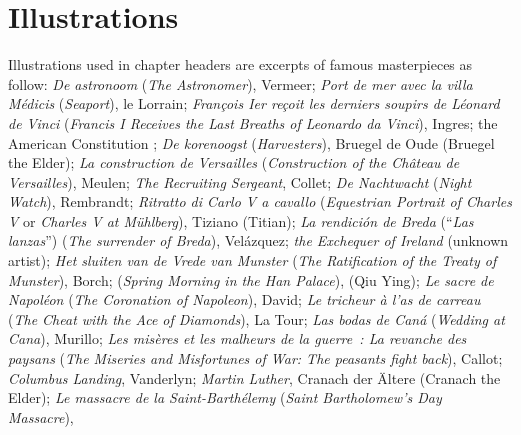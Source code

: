 \section*{Illustrations}
Illustrations used in
chapter headers are excerpts of famous masterpieces as follow:
\emph{De astronoom} (\emph{The Astronomer}), %
Vermeer;
\emph{Port de mer avec la villa Médicis} (\emph{Seaport}),
le Lorrain;
\emph{François I\textup{er} reçoit les derniers soupirs de Léonard de Vinci}
(\emph{Francis I Receives the Last Breaths of Leonardo da Vinci}),
Ingres;
the American Constitution%
;
\emph{De korenoogst} (\emph{Harvesters}), %
Bruegel de Oude (Bruegel the Elder);
\emph{La construction de Versailles} (\emph{Construction of the Château de
  Versailles}), %
Meulen;
\emph{The Recruiting Sergeant}, %
Collet;
\emph{De Nachtwacht} (\emph{Night Watch}), Rembrandt;
\emph{Ritratto di Carlo V a cavallo} (\emph{Equestrian Portrait of Charles V}
or \emph{Charles V at Mühlberg}), Tiziano %
(Titian);
\emph{La rendición de Breda} (``\emph{Las lanzas}'') (\emph{The surrender of
  Breda}), %
Velázquez;
\emph{the Exchequer of Ireland} (unknown artist);
\emph{Het sluiten van de Vrede van Munster} (\emph{The Ratification of the
  Treaty of Munster}), %
Borch;
 (\emph{Spring Morning in the Han Palace}), 
(Qiu Ying);
\emph{Le sacre de Napoléon} (\emph{The Coronation of Napoleon}),
David;
\emph{Le tricheur à l'as de carreau} (\emph{The Cheat with the Ace of
  Diamonds}), %
La Tour;
\emph{Las bodas de Caná} (\emph{Wedding at Cana}), %
Murillo;
\emph{Les misères et les malheurs de la guerre~: La revanche des paysans}
(\emph{The Miseries and Misfortunes of War: The peasants fight back}), %
Callot;
\emph{Columbus Landing}, %
Vanderlyn;
\emph{Martin Luther}, %
Cranach der \"{A}ltere (Cranach the Elder);
\emph{Le massacre de la Saint-Barthélemy} (\emph{Saint Bartholomew's Day
  Massacre}), %
